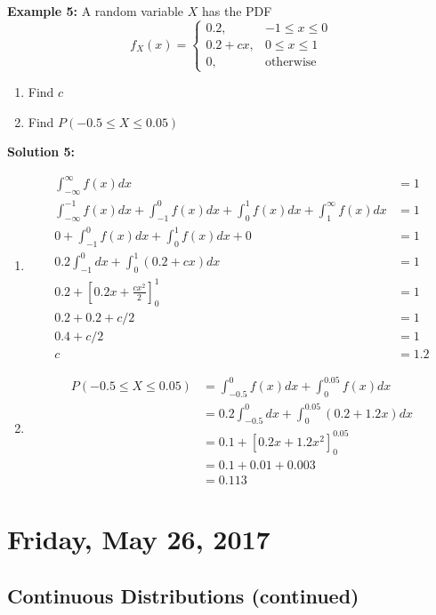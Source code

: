 \documentclass[12pt]{article}
\begin{document}
\textbf{Example 5:} A random variable $X$ has the PDF 
$$f_X (x) = 
\begin{cases}
	0.2, & -1 \leq x \leq 0\\
	0.2 + cx, & 0 \leq x \leq 1\\
	0, & \text{otherwise}
\end{cases}
$$
\begin{enumerate}
	\item{Find $c$}
	\item{Find $P(-0.5 \leq X \leq 0.05)$}
\end{enumerate}

\textbf{Solution 5:}
\begin{enumerate}
	\item{
	\begin{align*}
		\int_{-\infty}^{\infty} f(x) dx &= 1\\
		\int_{-\infty}^{-1} f(x) dx + \int_{-1}^{0} f(x) dx + \int_{0}^{1} f(x) dx + \int_{1}^{\infty} f(x) dx &= 1\\
		0 + \int_{-1}^{0} f(x) dx + \int_{0}^{1} f(x) dx + 0 &= 1\\
		0.2\int_{-1}^{0} dx + \int_{0}^{1} (0.2+cx) dx &= 1\\
		0.2 + [0.2x + \frac{cx^2}{2}]^{1}_{0} &= 1\\
		0.2 + 0.2 + c/2 &=1 \\
		0.4 + c/2 &= 1\\
		c &= 1.2
	\end{align*}
	}
	\item{
	\begin{align*}
		P(-0.5 \leq X \leq 0.05) &= \int_{-0.5}^{0} f(x) dx + \int_{0}^{0.05} f(x) dx\\
		&= 0.2 \int_{-0.5}^{0} dx + \int_{0}^{0.05} (0.2 + 1.2x) dx\\
		&= 0.1 + [0.2x + 1.2x^2]^{0.05}_{0}\\
		&= 0.1 + 0.01 + 0.003\\
		&= 0.113
	\end{align*}
	}
\end{enumerate}

\newpage

\section{Friday, May 26, 2017}

\subsection{Continuous Distributions (continued)}
\end{document}
